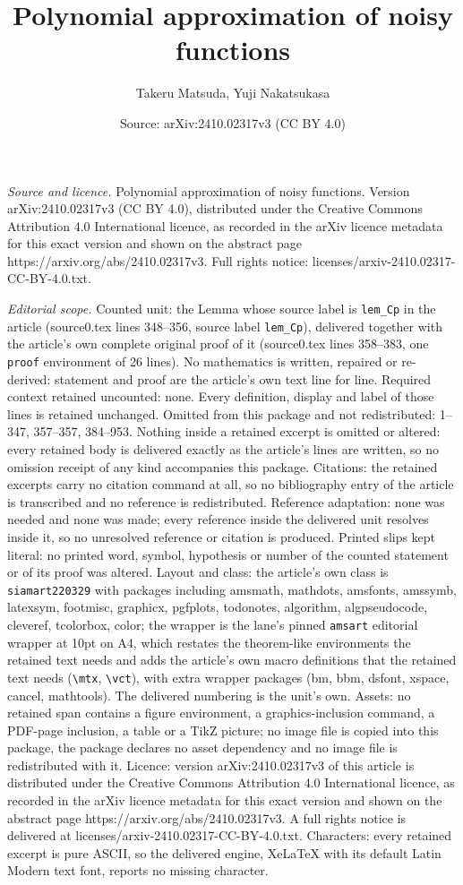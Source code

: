 \documentclass[10pt,a4paper]{amsart}
\title[Polynomial approximation of noisy functions]{Polynomial approximation of noisy functions}
\author{Takeru Matsuda, Yuji Nakatsukasa}
\date{Source: arXiv:2410.02317v3 (CC BY 4.0)}
\begin{document}
\maketitle

\noindent\emph{Source and licence.} Polynomial approximation of noisy functions. Version arXiv:2410.02317v3 (CC BY 4.0), distributed under the Creative Commons Attribution 4.0 International licence, as recorded in the arXiv licence metadata for this exact version and shown on the abstract page https://arxiv.org/abs/2410.02317v3. Full rights notice: licenses/arxiv-2410.02317-CC-BY-4.0.txt.\par\smallskip

\noindent\textit{Editorial scope.} Counted unit: the Lemma whose source label is \texttt{lem\_Cp} in the article (source0.tex lines 348--356, source label \texttt{lem\_Cp}), delivered together with the article's own complete original proof of it (source0.tex lines 358--383, one \texttt{proof} environment of 26 lines). No mathematics is written, repaired or re-derived: statement and proof are the article's own text line for line. Required context retained uncounted: none. Every definition, display and label of those lines is retained unchanged. Omitted from this package and not redistributed: 1--347, 357--357, 384--953. Nothing inside a retained excerpt is omitted or altered: every retained body is delivered exactly as the article's lines are written, so no omission receipt of any kind accompanies this package. Citations: the retained excerpts carry no citation command at all, so no bibliography entry of the article is transcribed and no reference is redistributed. Reference adaptation: none was needed and none was made; every reference inside the delivered unit resolves inside it, so no unresolved reference or citation is produced. Printed slips kept literal: no printed word, symbol, hypothesis or number of the counted statement or of its proof was altered. Layout and class: the article's own class is \texttt{siamart220329} with packages including amsmath, mathdots, amsfonts, amssymb, latexsym, footmisc, graphicx, pgfplots, todonotes, algorithm, algpseudocode, cleveref, tcolorbox, color; the wrapper is the lane's pinned \texttt{amsart} editorial wrapper at 10pt on A4, which restates the theorem-like environments the retained text needs and adds the article's own macro definitions that the retained text needs (\texttt{\textbackslash mtx}, \texttt{\textbackslash vct}), with extra wrapper packages (bm, bbm, dsfont, xspace, cancel, mathtools). The delivered numbering is the unit's own. Assets: no retained span contains a figure environment, a graphics-inclusion command, a PDF-page inclusion, a table or a TikZ picture; no image file is copied into this package, the package declares no asset dependency and no image file is redistributed with it. Licence: version arXiv:2410.02317v3 of this article is distributed under the Creative Commons Attribution 4.0 International licence, as recorded in the arXiv licence metadata for this exact version and shown on the abstract page https://arxiv.org/abs/2410.02317v3. A full rights notice is delivered at licenses/arxiv-2410.02317-CC-BY-4.0.txt. Characters: every retained excerpt is pure ASCII, so the delivered engine, XeLaTeX with its default Latin Modern text font, reports no missing character.
\end{document}
